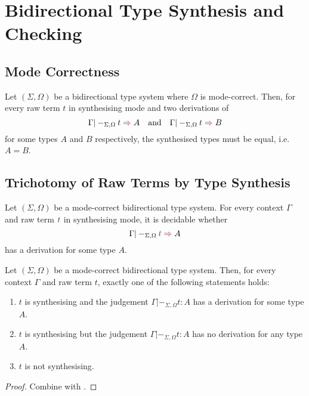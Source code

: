 
\section{Bidirectional Type Synthesis and Checking} \label{sec:type-synthesis}

\subsection{Mode Correctness}
\begin{definition}
\end{definition}


\begin{theorem}\label{thm:unique-syn}
  Let $(\Sigma, \Omega)$ be a bidirectional type system where $\Omega$ is mode-correct.
  Then, for every raw term $t$ in synthesising mode and two derivations of 
  \[
    \Gamma |-_{\Sigma, \Omega} t \syn A
    \quad\text{and}\quad
    \Gamma |-_{\Sigma, \Omega} t \syn B
  \]
  for some types $A$ and $B$ respectively, the synthesised types must be equal, i.e.\ $A = B$.
\end{theorem}
 

\subsection{Trichotomy of Raw Terms by Type Synthesis}

\begin{theorem} \label{thm:bidirectional-type-synthesis}
  Let $(\Sigma, \Omega)$ be a mode-correct bidirectional type system.
  For every context $\Gamma$ and raw term $\isTerm{t}$ in synthesising mode, it is decidable whether
  \[
    \Gamma |-_{\Sigma, \Omega} \isTerm{t} \syn A
  \]
  has a derivation for some type $A$.
\end{theorem}

\begin{corollary}
  Let $(\Sigma, \Omega)$ be a mode-correct bidirectional type system.
  Then, for every context $\Gamma$ and raw term $t$, exactly one of the following statements holds:
  \begin{enumerate}
    \item $t$ is synthesising and the judgement $\Gamma |-_{\Sigma, \Omega} t : A$ has a derivation for some type $A$.
    \item $t$ is synthesising but the judgement $\Gamma |-_{\Sigma, \Omega} t : A$ has no derivation for any type $A$.
    \item $t$ is not synthesising.
  \end{enumerate}
\end{corollary}
\begin{proof}
  Combine   with .
  
\end{proof}

